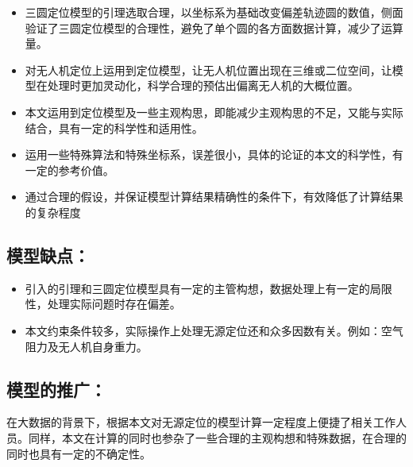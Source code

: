 \begin{itemize}
    \item 三圆定位模型的引理选取合理，以坐标系为基础改变偏差轨迹圆的数值，侧面验证了三圆定位模型的合理性，避免了单个圆的各方面数据计算，减少了运算量。\cite{TongJiDaXueShuXueXiGaoDengShuXue}
    \item 对无人机定位上运用到定位模型，让无人机位置出现在三维或二位空间，让模型在处理时更加灵动化，科学合理的预估出偏离无人机的大概位置。
    \item 本文运用到定位模型及一些主观构思，即能减少主观构思的不足，又能与实际结合，具有一定的科学性和适用性。
    \item 运用一些特殊算法和特殊坐标系，误差很小，具体的论证的本文的科学性，有一定的参考价值。
    \item 通过合理的假设，并保证模型计算结果精确性的条件下，有效降低了计算结果的复杂程度
\end{itemize}

\subsection{模型缺点：}

\begin{itemize}
    \item 引入的引理和三圆定位模型具有一定的主管构想，数据处理上有一定的局限性，处理实际问题时存在偏差。
    \item 本文约束条件较多，实际操作上处理无源定位还和众多因数有关。例如：空气阻力及无人机自身重力。
\end{itemize}

\subsection{模型的推广：}

在大数据的背景下，根据本文对无源定位的模型计算一定程度上便捷了相关工作人员。同样，本文在计算的同时也参杂了一些合理的主观构想和特殊数据，在合理的同时也具有一定的不确定性。
